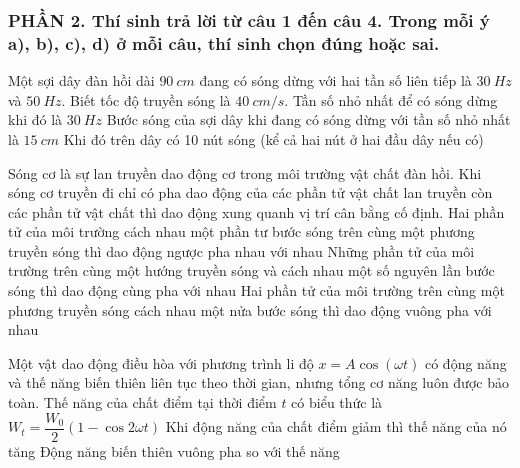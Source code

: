 \subsubsection*{PHẦN 2. Thí sinh trả lời từ câu 1 đến câu 4. Trong mỗi ý a), b), c), d) ở mỗi câu, thí sinh chọn đúng hoặc sai.}
\setcounter{ex}{0}
\begin{ex}
	Một sợi dây đàn hồi dài $90 ~cm$ đang có sóng dừng với hai tần số liên tiếp là $30 ~Hz$ và $50 ~Hz$. Biết tốc độ truyền sóng là $40 ~cm/s$.
		{Tần số nhỏ nhất để có sóng dừng khi đó là $30 ~Hz$}
		{Bước sóng của sợi dây khi đang có sóng dừng với tần số nhỏ nhất là $15 ~cm$}
		{Khi đó trên dây có 10 nút sóng (kể cả hai nút ở hai đầu dây nếu có)}
	\loigiai{
		\begin{itemchoice}
		\itemch
		\itemch 
		\itemch 
		\itemch 
	\end{itemchoice}
	}
\end{ex}
\begin{ex}
	Sóng cơ là sự lan truyền dao động cơ trong môi trường vật chất đàn hồi. Khi sóng cơ truyền đi chỉ có pha dao động của các phần tử vật chất lan truyền còn các phần tử vật chất thì dao động xung quanh vị trí cân bằng cố định.
	{Hai phần tử của môi trường cách nhau một phần tư bước sóng trên cùng một phương truyền sóng thì dao động ngược pha nhau với nhau}
	{\True Những phần tử của môi trường trên cùng một hướng truyền sóng và cách nhau một số nguyên lần bước sóng thì dao động cùng pha với nhau}
	{Hai phần tử của môi trường trên cùng một phương truyền sóng cách nhau một nửa bước sóng thì dao động vuông pha với nhau}
\end{ex}
\begin{ex}
Một vật dao động điều hòa với phương trình li độ $x = A\cos(\omega t)$ có động năng và thế năng biến thiên liên tục theo thời gian, nhưng tổng cơ năng luôn được bảo toàn. 
	{Thế năng của chất điểm tại thời điểm $t$ có biểu thức là $W_{t}=\dfrac{W_0}{2}(1-\cos 2 \omega t)$}
	{\True Khi động năng của chất điểm giảm thì thế năng của nó tăng}
	{Động năng biến thiên vuông pha so với thế năng}
\end{ex}

